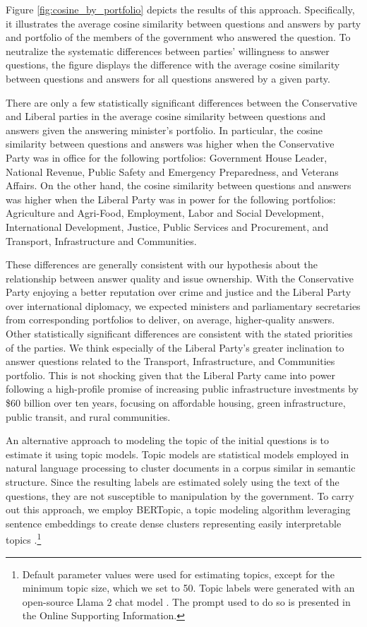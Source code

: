 {{Figure \ref{fig:cosine_by_portfolio} depicts the results of this approach. Specifically, it illustrates the average cosine similarity between questions and answers by party and portfolio of the members of the government who answered the question. To neutralize the systematic differences between parties’ willingness to answer questions, the figure displays the difference with the average cosine similarity between questions and answers for all questions answered by a given party.

There are only a few statistically significant differences between the Conservative and Liberal parties in the average cosine similarity between questions and answers given the answering minister’s portfolio. In particular, the cosine similarity between questions and answers was higher when the Conservative Party was in office for the following portfolios: Government House Leader, National Revenue, Public Safety and Emergency Preparedness, and Veterans Affairs. On the other hand, the cosine similarity between questions and answers was higher when the Liberal Party was in power for the following portfolios: Agriculture and Agri-Food, Employment, Labor and Social Development, International Development, Justice, Public Services and Procurement, and Transport, Infrastructure and Communities.

These differences are generally consistent with our hypothesis about the relationship between answer quality and issue ownership. With the Conservative Party enjoying a better reputation over crime and justice and the Liberal Party over international diplomacy, we expected ministers and parliamentary secretaries from corresponding portfolios to deliver, on average, higher-quality answers. Other statistically significant differences are consistent with the stated priorities of the parties. We think especially of the Liberal Party’s greater inclination to answer questions related to the Transport, Infrastructure, and Communities portfolio. This is not shocking given that the Liberal Party came into power following a high-profile promise of increasing public infrastructure investments by \$60 billion over ten years, focusing on affordable housing, green infrastructure, public transit, and rural communities.

An alternative approach to modeling the topic of the initial questions is to estimate it using topic models. Topic models are statistical models employed in natural language processing to cluster documents in a corpus similar in semantic structure. Since the resulting labels are estimated solely using the text of the questions, they are not susceptible to manipulation by the government. To carry out this approach, we employ BERTopic, a topic modeling algorithm leveraging sentence embeddings to create dense clusters representing easily interpretable topics \citep{grootendorst2022bertopic}.\footnote{Default parameter values were used for estimating topics, except for the minimum topic size, which we set to 50. Topic labels were generated with an open-source Llama 2 chat model \citep{touvron2023llama}. The prompt used to do so is presented in the Online Supporting Information.}

}}
